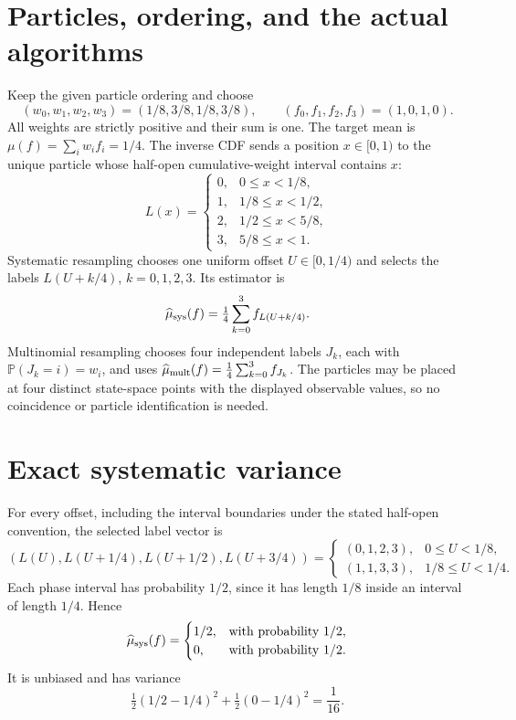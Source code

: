 \documentclass[11pt]{article}
\begin{document}
\section*{Particles, ordering, and the actual algorithms}
Keep the given particle ordering and choose
\[
 (w_0,w_1,w_2,w_3)=(1/8,3/8,1/8,3/8),\qquad
 (f_0,f_1,f_2,f_3)=(1,0,1,0).
\]
All weights are strictly positive and their sum is one. The target mean
is $\mu(f)=\sum_i w_i f_i=1/4$.
The inverse CDF sends a position $x\in[0,1)$ to the unique particle
whose half-open cumulative-weight interval contains $x$:
\[
 L(x)=\begin{cases}
 0,&0\leq x<1/8,\\
 1,&1/8\leq x<1/2,\\
 2,&1/2\leq x<5/8,\\
 3,&5/8\leq x<1.
 \end{cases}
\]
Systematic resampling chooses one uniform offset $U\in[0,1/4)$ and
selects the labels $L(U+k/4)$, $k=0,1,2,3$. Its estimator is
\[
 \widehat\mu_{\rm sys}(f)=\tfrac14\sum_{k=0}^3 f_{L(U+k/4)}.
\]
Multinomial resampling chooses four independent labels $J_k$, each with
$\mathbb P(J_k=i)=w_i$, and uses
$\widehat\mu_{\rm mult}(f)=\tfrac14\sum_{k=0}^3 f_{J_k}$.
The particles may be placed at four distinct state-space points with the
displayed observable values, so no coincidence or particle identification
is needed.

\section*{Exact systematic variance}
For every offset, including the interval boundaries under the stated
half-open convention, the selected label vector is
\[
 (L(U),L(U+1/4),L(U+1/2),L(U+3/4))
 =\begin{cases}
 (0,1,2,3),&0\leq U<1/8,\\
 (1,1,3,3),&1/8\leq U<1/4.
 \end{cases}
\]
Each phase interval has probability $1/2$, since it has length $1/8$
inside an interval of length $1/4$. Hence
\[
 \widehat\mu_{\rm sys}(f)=
 \begin{cases}1/2,&\text{with probability }1/2,\\
 0,&\text{with probability }1/2.
 \end{cases}
\]
It is unbiased and has variance
\[
 \tfrac12(1/2-1/4)^2+\tfrac12(0-1/4)^2=\frac1{16}.
\]
\end{document}
